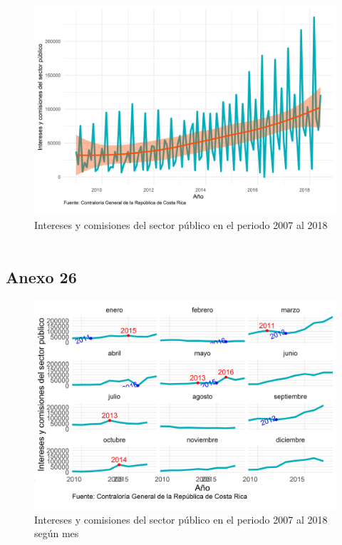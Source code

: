 \documentclass[
]{article}
\begin{document}
\begin{figure}[H]
\includegraphics[width=1\linewidth,height=1\textheight]{Tesis_files/figure-latex/interesesplotgeneral-1} \caption{Intereses y comisiones del sector público en el periodo 2007 al 2018 \textcolor{white}{prueba de aaaaaaaaaaaaaaaaaaaaaaa}}\label{fig:interesesplotgeneral}
\end{figure}

\subsection{Anexo 26}

\begin{figure}[H]
\includegraphics[width=1\linewidth,height=1\textheight]{Tesis_files/figure-latex/interesesplotperiodos-1} \caption{Intereses y comisiones del sector público en el periodo 2007 al 2018 según mes \textcolor{white}{prueba de aaaaaaaaaaaaaaaaaaaaaaa}}\label{fig:interesesplotperiodos}
\end{figure}
\end{document}
